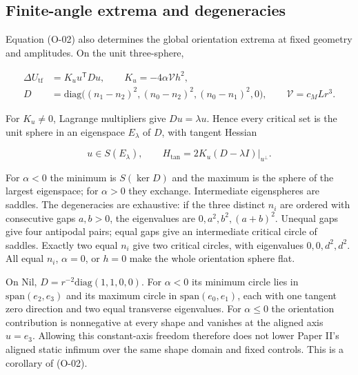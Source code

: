 \subsection{Finite-angle extrema and degeneracies}

Equation (O-02) also determines the global orientation extrema at fixed
geometry and amplitudes. On the unit three-sphere,

\begin{equation}\tag{O-07}\label{eq:O-07}
\begin{aligned}
\Delta U_{\mathrm{tf}}&=K_u u^{\mathsf T}D u,\qquad K_u=-4\alpha\mathcal V h^2,\\
D&=\mathrm{diag}\big((n_1-n_2)^2,(n_0-n_2)^2,(n_0-n_1)^2,0\big),
\qquad\mathcal V=c_M Lr^3.
\end{aligned}
\end{equation}

For $K_u\ne0$, Lagrange multipliers give $Du=\lambda u$. Hence every critical
set is the unit sphere in an eigenspace $E_\lambda$ of $D$, with tangent Hessian

\begin{equation}\tag{O-08}\label{eq:O-08}
u\in S(E_\lambda),\qquad
H_{\mathrm{tan}}=\left.2K_u(D-\lambda I)\right|_{u^\perp}.
\end{equation}

For $\alpha<0$ the minimum is $S(\ker D)$ and the maximum is the sphere of
the largest eigenspace; for $\alpha>0$ they exchange. Intermediate eigenspheres
are saddles. The degeneracies are exhaustive: if the three distinct $n_i$
are ordered with consecutive gaps $a,b>0$, the eigenvalues are
$0,a^2,b^2,(a+b)^2$. Unequal gaps give four antipodal pairs; equal gaps give
an intermediate critical circle of saddles. Exactly two equal $n_i$ give
two critical circles, with eigenvalues $0,0,d^2,d^2$. All equal $n_i$,
$\alpha=0$, or $h=0$ make the whole orientation sphere flat.

On Nil, $D=r^{-2}\mathrm{diag}(1,1,0,0)$. For $\alpha<0$ its minimum circle
lies in $\mathrm{span}(e_2,e_3)$ and its maximum circle in
$\mathrm{span}(e_0,e_1)$, each with one tangent zero direction and two equal
transverse eigenvalues. For $\alpha\le0$ the orientation contribution is
nonnegative at every shape and vanishes at the aligned axis $u=e_3$.
Allowing this constant-axis freedom therefore does not lower Paper II's
aligned static infimum over the same shape domain and fixed controls.
This is a corollary of (O-02).
